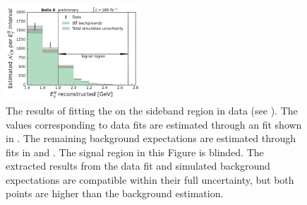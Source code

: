 \begin{figure}[hbtp!]
    \centering
    \includegraphics[width=0.45\textwidth]{figures/data_validation/sidebands_background_vs_data.pdf}
    \caption{\label{fig:sidebands_background_versus_data} The results of fitting the \Mbc on the sideband region in data (see ).
    The values corresponding to data fits are estimated through an \Mbc fit shown in .
    The remaining \BB background expectations are estimated through \Mbc fits in  and .
    The signal region in this Figure is blinded.
    The extracted results from the data fit and simulated background expectations 
    are compatible within their full uncertainty, but both points are higher than the background estimation.
    }
\end{figure}

